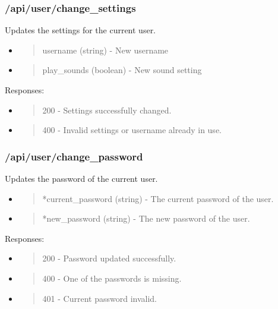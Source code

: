 \hypertarget{apiuserchange_settings}{%
\subsubsection{/api/user/change\_settings}\label{apiuserchange_settings}}

Updates the settings for the current user.

\begin{itemize}
\item
  \begin{quote}
  username (string) - New username
  \end{quote}
\item
  \begin{quote}
  play\_sounds (boolean) - New sound setting
  \end{quote}
\end{itemize}

Responses:

\begin{itemize}
\item
  \begin{quote}
  200 - Settings successfully changed.
  \end{quote}
\item
  \begin{quote}
  400 - Invalid settings or username already in use.
  \end{quote}
\end{itemize}

\hypertarget{apiuserchange_password}{%
\subsubsection{/api/user/change\_password}\label{apiuserchange_password}}

Updates the password of the current user.

\begin{itemize}
\item
  \begin{quote}
  *current\_password (string) - The current password of the user.
  \end{quote}
\item
  \begin{quote}
  *new\_password (string) - The new password of the user.
  \end{quote}
\end{itemize}

Responses:

\begin{itemize}
\item
  \begin{quote}
  200 - Password updated successfully.
  \end{quote}
\item
  \begin{quote}
  400 - One of the passwords is missing.
  \end{quote}
\item
  \begin{quote}
  401 - Current password invalid.
  \end{quote}
\end{itemize}

